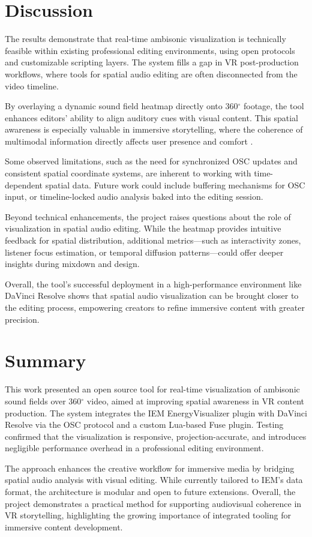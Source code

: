 \documentclass[convention,student-expo]{aesconf} %
\begin{document}
\section{Discussion}

The results demonstrate that real-time ambisonic visualization is technically feasible within existing professional editing environments, using open protocols and customizable scripting layers. The system fills a gap in VR post-production workflows, where tools for spatial audio editing are often disconnected from the video timeline.

By overlaying a dynamic sound field heatmap directly onto 360$^\circ$ footage, the tool enhances editors’ ability to align auditory cues with visual content. This spatial awareness is especially valuable in immersive storytelling, where the coherence of multimodal information directly affects user presence and comfort \citep{yagunova2021ambisonics}.

Some observed limitations, such as the need for synchronized OSC updates and consistent spatial coordinate systems, are inherent to working with time-dependent spatial data. Future work could include buffering mechanisms for OSC input, or timeline-locked audio analysis baked into the editing session.

Beyond technical enhancements, the project raises questions about the role of visualization in spatial audio editing. While the heatmap provides intuitive feedback for spatial distribution, additional metrics—such as interactivity zones, listener focus estimation, or temporal diffusion patterns—could offer deeper insights during mixdown and design.

Overall, the tool’s successful deployment in a high-performance environment like DaVinci Resolve shows that spatial audio visualization can be brought closer to the editing process, empowering creators to refine immersive content with greater precision.

\section{Summary}

This work presented an open source tool for real-time visualization of ambisonic sound fields over 360$^\circ$ video, aimed at improving spatial awareness in VR content production. The system integrates the IEM EnergyVisualizer plugin with DaVinci Resolve via the OSC protocol and a custom Lua-based Fuse plugin. Testing confirmed that the visualization is responsive, projection-accurate, and introduces negligible performance overhead in a professional editing environment.

The approach enhances the creative workflow for immersive media by bridging spatial audio analysis with visual editing. While currently tailored to IEM’s data format, the architecture is modular and open to future extensions. Overall, the project demonstrates a practical method for supporting audiovisual coherence in VR storytelling, highlighting the growing importance of integrated tooling for immersive content development.




\end{document}
